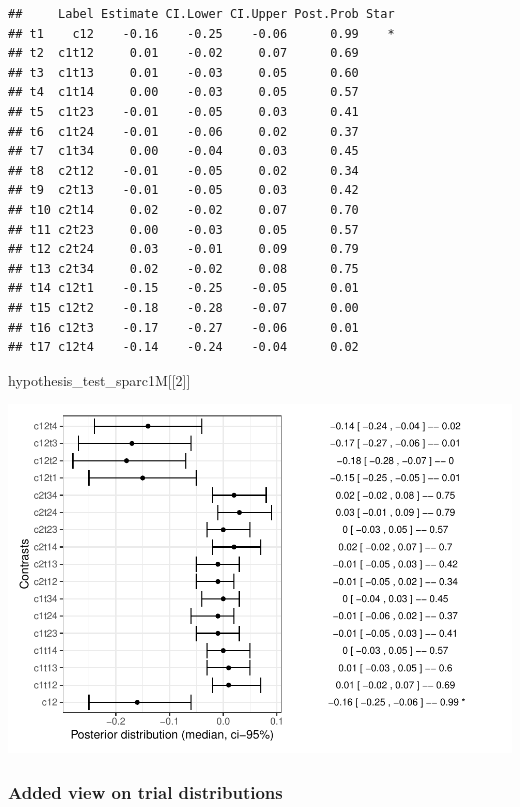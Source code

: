 \documentclass[
]{article}
\newenvironment{Shaded}{\begin{snugshade}}{\end{snugshade}}
\newcommand{\DecValTok}[1]{\textcolor[rgb]{0.00,0.00,0.81}{#1}}
\newcommand{\NormalTok}[1]{#1}
\begin{document}
\begin{verbatim}
##     Label Estimate CI.Lower CI.Upper Post.Prob Star
## t1    c12    -0.16    -0.25    -0.06      0.99    *
## t2  c1t12     0.01    -0.02     0.07      0.69     
## t3  c1t13     0.01    -0.03     0.05      0.60     
## t4  c1t14     0.00    -0.03     0.05      0.57     
## t5  c1t23    -0.01    -0.05     0.03      0.41     
## t6  c1t24    -0.01    -0.06     0.02      0.37     
## t7  c1t34     0.00    -0.04     0.03      0.45     
## t8  c2t12    -0.01    -0.05     0.02      0.34     
## t9  c2t13    -0.01    -0.05     0.03      0.42     
## t10 c2t14     0.02    -0.02     0.07      0.70     
## t11 c2t23     0.00    -0.03     0.05      0.57     
## t12 c2t24     0.03    -0.01     0.09      0.79     
## t13 c2t34     0.02    -0.02     0.08      0.75     
## t14 c12t1    -0.15    -0.25    -0.05      0.01     
## t15 c12t2    -0.18    -0.28    -0.07      0.00     
## t16 c12t3    -0.17    -0.27    -0.06      0.01     
## t17 c12t4    -0.14    -0.24    -0.04      0.02
\end{verbatim}

\begin{Shaded}
\begin{Highlighting}[]
\NormalTok{hypothesis\_test\_sparc1M[[}\DecValTok{2}\NormalTok{]]}
\end{Highlighting}
\end{Shaded}

\includegraphics{08_Publish_GUSO_ASIL_files/figure-latex/Contrasts1M-2.pdf}

\hypertarget{added-view-on-trial-distributions}{%
\subsubsection{Added view on trial
distributions}\label{added-view-on-trial-distributions}}
\end{document}
